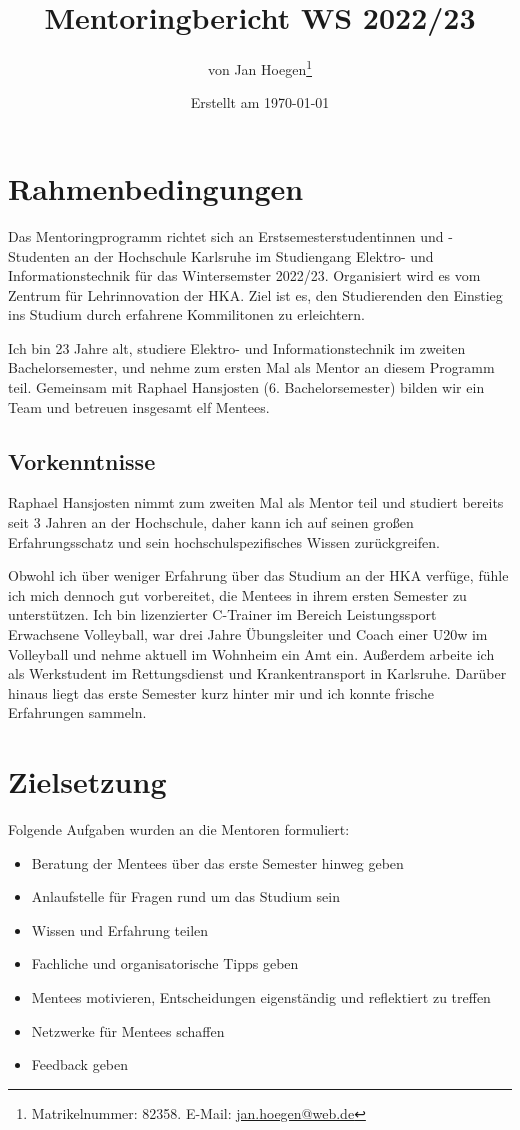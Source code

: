 \documentclass[
    paper=A4,
    div=calc,
    numbers=noendperiod
]{scrartcl}
\title{Mentoringbericht WS 2022/23}
\author{von Jan Hoegen\thanks{Matrikelnummer: 82358. E-Mail: \href{mailto:jan.hoegen@web.de}{jan.hoegen@web.de}}}
\date{Erstellt am \today}
\begin{document}
\maketitle

\tableofcontents

\section{Rahmenbedingungen}
    Das Mentoringprogramm richtet sich an Erstsemesterstudentinnen und -Studenten an der Hochschule Karlsruhe im Studiengang Elektro- und Informationstechnik für das Wintersemster 2022/23. Organisiert wird es vom Zentrum für Lehrinnovation der HKA. Ziel ist es, den Studierenden den Einstieg ins Studium durch erfahrene Kommilitonen zu erleichtern.

    Ich bin 23 Jahre alt, studiere Elektro- und Informationstechnik im zweiten Bachelorsemester, und nehme zum ersten Mal als Mentor an diesem Programm teil. Gemeinsam mit Raphael Hansjosten (6. Bachelorsemester) bilden wir ein Team und betreuen insgesamt elf Mentees. 

    \subsection*{Vorkenntnisse}
        Raphael Hansjosten nimmt zum zweiten Mal als Mentor teil und studiert bereits seit 3 Jahren an der Hochschule, daher kann ich auf seinen großen Erfahrungsschatz und sein hochschulspezifisches Wissen zurückgreifen. 

        Obwohl ich über weniger Erfahrung über das Studium an der HKA verfüge, fühle ich mich dennoch gut vorbereitet, die Mentees in ihrem ersten Semester zu unterstützen. Ich bin lizenzierter C-Trainer im Bereich Leistungssport Erwachsene Volleyball, war drei Jahre Übungsleiter und Coach einer U20w im Volleyball und nehme aktuell im Wohnheim ein Amt ein. Außerdem arbeite ich als Werkstudent im Rettungsdienst und Krankentransport in Karlsruhe. Darüber hinaus liegt das erste Semester kurz hinter mir und ich konnte frische Erfahrungen sammeln.
 
\section{Zielsetzung}
    Folgende Aufgaben wurden an die Mentoren formuliert:

    \begin{itemize}
        \item Beratung der Mentees über das erste Semester hinweg geben
        \item Anlaufstelle für Fragen rund um das Studium sein
        \item Wissen und Erfahrung teilen
        \item Fachliche und organisatorische Tipps geben
        \item Mentees motivieren, Entscheidungen eigenständig und reflektiert zu treffen
        \item Netzwerke für Mentees schaffen
        \item Feedback geben
    \end{itemize}
\end{document}
